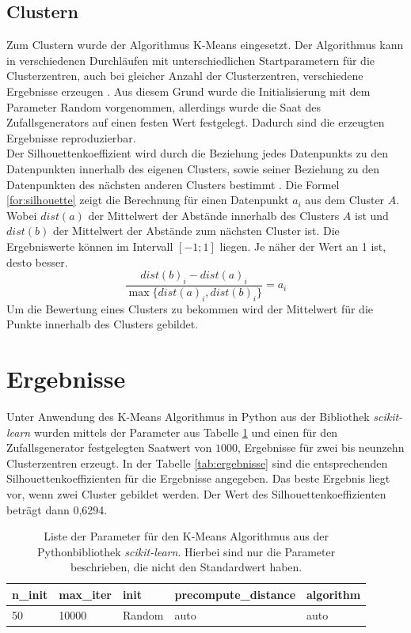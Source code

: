 \documentclass[12pt]{article}
\begin{document}
\subsection*{Clustern}
Zum Clustern wurde der Algorithmus K-Means eingesetzt. Der Algorithmus kann in verschiedenen Durchl\"aufen mit unterschiedlichen Startparametern f\"ur die Clusterzentren, auch bei gleicher Anzahl der Clusterzentren, verschiedene Ergebnisse erzeugen \cite{MacQueen1967}. Aus diesem Grund wurde die Initialisierung mit dem Parameter Random vorgenommen, allerdings wurde die Saat des Zufallsgenerators auf einen festen Wert festgelegt. Dadurch sind die erzeugten Ergebnisse reproduzierbar.\\
Der Silhouettenkoeffizient wird durch die Beziehung jedes Datenpunkts zu den Datenpunkten innerhalb des eigenen Clusters, sowie seiner Beziehung zu den Datenpunkten des n\"achsten anderen Clusters bestimmt \cite{Rousseeuw1987}. Die Formel \ref{for:silhouette} zeigt die Berechnung f\"ur einen Datenpunkt \(a_i\) aus dem Cluster \(A\). Wobei \(dist(a)\) der Mittelwert der Abst\"ande innerhalb des Clusters \(A\) ist und \(dist(b)\) der Mittelwert der Abst\"ande zum n\"achsten Cluster ist. Die Ergebniswerte k\"onnen im Intervall \([-1;1]\) liegen. Je n\"aher der Wert an 1 ist, desto besser.
\begin{equation}\label{for:silhouette}
	\frac{dist(b)_i - dist(a)_i}{\max{\{dist(a)_i, dist(b)_i\}}} = a_i
\end{equation}
Um die Bewertung eines Clusters zu bekommen wird der Mittelwert f\"ur die Punkte innerhalb des Clusters gebildet.

\section*{Ergebnisse}
Unter Anwendung des K-Means Algorithmus in Python aus der Bibliothek \textit{scikit-learn} wurden mittels der Parameter aus Tabelle \ref{tab:Parameter} und einen f\"ur den Zufallsgenerator festgelegten Saatwert von \(1000\), Ergebnisse f\"ur zwei bis neunzehn Clusterzentren erzeugt. In der Tabelle \ref{tab:ergebnisse} sind die entsprechenden Silhouettenkoeffizienten f\"ur die Ergebnisse angegeben. Das beste Ergebnis liegt vor, wenn zwei Cluster gebildet werden. Der Wert des Silhouettenkoeffizienten betr\"agt dann 0,6294.

\begin{table}[h]
	\caption{\label{tab:Parameter}Liste der Parameter f\"ur den K-Means Algorithmus aus der Pythonbibliothek \textit{scikit-learn}. Hierbei sind nur die Parameter beschrieben, die nicht den Standardwert haben.}
	\noindent \centering{}
	\bgroup
	\def\arraystretch{2}  %
	\begin{tabular}{|l|l|l|l|l|}
		\hline
		\textbf{n\_init} & \textbf{max\_iter} & \textbf{init} & \textbf{precompute\_distance} & 	\textbf{algorithm}\\
		\hline \hline
		50 & 10000 & Random & auto & auto \\
		\hline
	\end{tabular}
	\egroup
\end{table}
\end{document}
